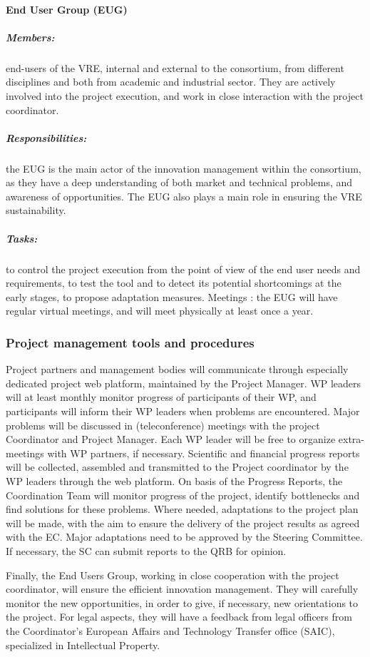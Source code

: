 \paragraph{End User Group (EUG)}
\subparagraph{Members:} end-users of the VRE, internal and external to
the consortium, from different disciplines and both from academic and
industrial sector. They are actively involved into the project
execution, and work in close interaction with the project coordinator.

\subparagraph{Responsibilities:} the EUG is the main actor of the innovation
management within the consortium, as they have a deep understanding of
both market and technical problems, and awareness of
opportunities. The EUG also plays a main role in ensuring the VRE
sustainability.  

\subparagraph{Tasks:} to control the project execution from the
point of view of the end user needs and requirements, to test the tool
and to detect its potential shortcomings at the early stages, to
propose adaptation measures.  Meetings : the EUG will have regular
virtual meetings, and will meet physically at least once a year.


\subsubsection{Project management tools and procedures}

Project partners and management bodies will communicate through
especially dedicated project web platform, maintained by the Project
Manager. WP leaders will at least monthly monitor progress of
participants of their WP, and participants will inform their WP
leaders when problems are encountered. Major problems will be
discussed in (teleconference) meetings with the project Coordinator
and Project Manager. Each WP leader will be free to organize
extra-meetings with WP partners, if necessary. Scientific and
financial progress reports will be collected, assembled and
transmitted to the Project coordinator by the WP leaders through the
web platform. On basis of the Progress Reports, the Coordination Team
will monitor progress of the project, identify bottlenecks and find
solutions for these problems. Where needed, adaptations to the project
plan will be made, with the aim to ensure the delivery of the project
results as agreed with the EC. Major adaptations need to be approved
by the Steering Committee.  If necessary, the SC can submit reports to
the QRB for opinion.

Finally, the End Users Group, working in close cooperation with the
project coordinator, will ensure the efficient innovation
management. They will carefully monitor the new opportunities, in
order to give, if necessary, new orientations to the project. For
legal aspects, they will have a feedback from legal officers from the
Coordinator’s European Affairs and Technology Transfer office (SAIC),
specialized in Intellectual Property.



